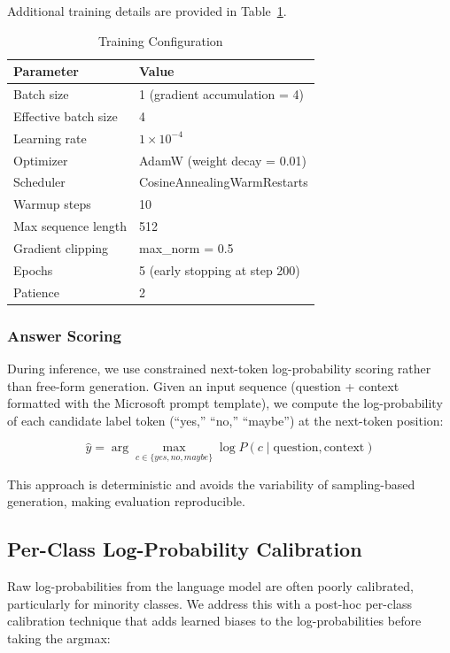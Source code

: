 \documentclass[conference]{IEEEtran}
\begin{document}
Additional training details are provided in Table~\ref{tab:training_config}.

\begin{table}[h]
\centering
\caption{Training Configuration}
\label{tab:training_config}
\begin{tabular}{ll}
\toprule
\textbf{Parameter} & \textbf{Value} \\
\midrule
Batch size & 1 (gradient accumulation = 4) \\
Effective batch size & 4 \\
Learning rate & $1 \times 10^{-4}$ \\
Optimizer & AdamW (weight decay = 0.01) \\
Scheduler & CosineAnnealingWarmRestarts \\
Warmup steps & 10 \\
Max sequence length & 512 \\
Gradient clipping & max\_norm = 0.5 \\
Epochs & 5 (early stopping at step 200) \\
Patience & 2 \\
\bottomrule
\end{tabular}
\end{table}

\subsubsection{Answer Scoring}

During inference, we use constrained next-token log-probability scoring rather than free-form generation. Given an input sequence (question + context formatted with the Microsoft prompt template), we compute the log-probability of each candidate label token (``yes,'' ``no,'' ``maybe'') at the next-token position:

\begin{equation}
    \hat{y} = \arg\max_{c \in \{yes, no, maybe\}} \log P(c \mid \text{question}, \text{context})
\end{equation}

This approach is deterministic and avoids the variability of sampling-based generation, making evaluation reproducible.

\subsection{Per-Class Log-Probability Calibration}

Raw log-probabilities from the language model are often poorly calibrated, particularly for minority classes. We address this with a post-hoc per-class calibration technique that adds learned biases to the log-probabilities before taking the argmax:
\end{document}

